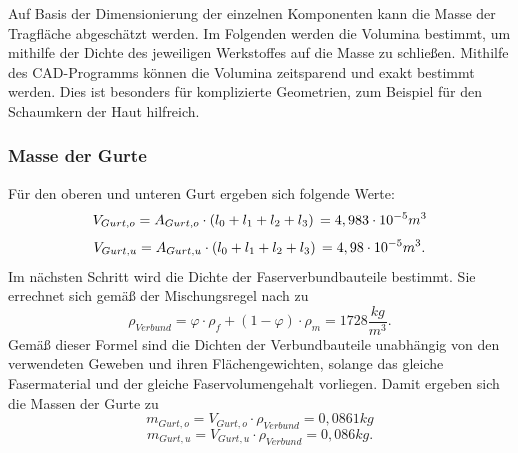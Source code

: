 Auf Basis der Dimensionierung der einzelnen Komponenten kann die Masse der Tragfläche abgeschätzt werden. Im Folgenden werden die Volumina bestimmt, um mithilfe der Dichte des jeweiligen Werkstoffes auf die Masse zu schließen. Mithilfe des CAD-Programms können die Volumina zeitsparend und exakt bestimmt werden. Dies ist besonders für komplizierte Geometrien, zum Beispiel für den Schaumkern der Haut hilfreich.
\subsubsection{Masse der Gurte}
Für den oberen und unteren Gurt ergeben sich folgende Werte: 
\begin{equation}
	V_{Gurt,o}=A_{Gurt,o}\cdot \left(l_{0}+l_{1}+l_{2}+l_{3}\right)\\
	=4,983\cdot 10^{-5}m^{3}
\end{equation}
\begin{equation}
	V_{Gurt,u}=A_{Gurt,u}\cdot \left(l_{0}+l_{1}+l_{2}+l_{3}\right)\\
	=4,98\cdot 10^{-5}m^{3}.
\end{equation}
 Im nächsten Schritt wird die Dichte der Faserverbundbauteile bestimmt. Sie errechnet sich gemäß der Mischungsregel nach \cite{item3} zu
\begin{equation}
	\rho_{Verbund}=\varphi\cdot\rho_{f}+\left(1-\varphi\right)\cdot\rho_{m}
	=1728\frac{kg}{m^{3}}.
\end{equation}
Gemäß dieser Formel sind die Dichten der Verbundbauteile unabhängig von den verwendeten Geweben und ihren Flächengewichten, solange das gleiche Fasermaterial und der gleiche Faservolumengehalt vorliegen. Damit ergeben sich die Massen der Gurte zu
\begin{equation}
	m_{Gurt,o}=V_{Gurt,o}\cdot\rho_{Verbund}=0,0861kg
\end{equation}
\begin{equation}
		m_{Gurt,u}=V_{Gurt,u}\cdot\rho_{Verbund}=0,086kg .
\end{equation}

